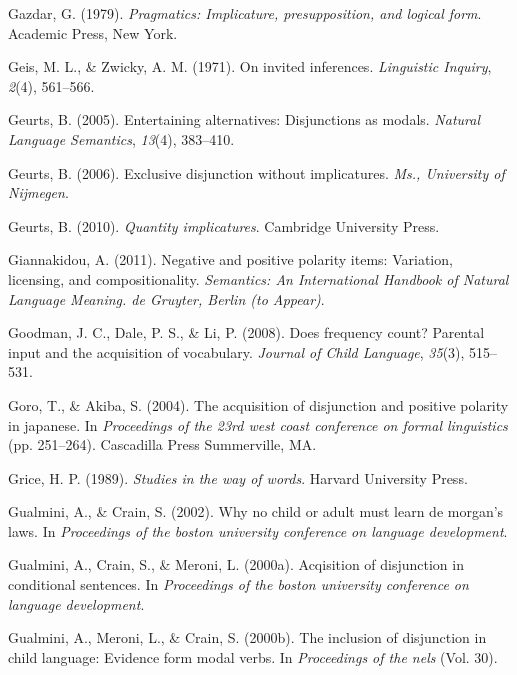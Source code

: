 \documentclass[oneside]{report}
\theoremstyle{definition}
\theoremstyle{definition}
\theoremstyle{definition}
\theoremstyle{remark}
\begin{document}
\hypertarget{ref-gazdar79}{}
Gazdar, G. (1979). \emph{Pragmatics: Implicature, presupposition, and
logical form}. Academic Press, New York.

\hypertarget{ref-geis1971invited}{}
Geis, M. L., \& Zwicky, A. M. (1971). On invited inferences.
\emph{Linguistic Inquiry}, \emph{2}(4), 561--566.

\hypertarget{ref-geurts2005entertaining}{}
Geurts, B. (2005). Entertaining alternatives: Disjunctions as modals.
\emph{Natural Language Semantics}, \emph{13}(4), 383--410.

\hypertarget{ref-geurts2006exclusive}{}
Geurts, B. (2006). Exclusive disjunction without implicatures.
\emph{Ms., University of Nijmegen}.

\hypertarget{ref-geurts2010quantity}{}
Geurts, B. (2010). \emph{Quantity implicatures}. Cambridge University
Press.

\hypertarget{ref-giannakidou2011negative}{}
Giannakidou, A. (2011). Negative and positive polarity items: Variation,
licensing, and compositionality. \emph{Semantics: An International
Handbook of Natural Language Meaning. de Gruyter, Berlin (to Appear)}.

\hypertarget{ref-goodman2008does}{}
Goodman, J. C., Dale, P. S., \& Li, P. (2008). Does frequency count?
Parental input and the acquisition of vocabulary. \emph{Journal of Child
Language}, \emph{35}(3), 515--531.

\hypertarget{ref-goro2004acquisition}{}
Goro, T., \& Akiba, S. (2004). The acquisition of disjunction and
positive polarity in japanese. In \emph{Proceedings of the 23rd west
coast conference on formal linguistics} (pp. 251--264). Cascadilla Press
Summerville, MA.

\hypertarget{ref-grice1989studies}{}
Grice, H. P. (1989). \emph{Studies in the way of words}. Harvard
University Press.

\hypertarget{ref-gualminicrain2002}{}
Gualmini, A., \& Crain, S. (2002). Why no child or adult must learn de
morgan's laws. In \emph{Proceedings of the boston university conference
on language development}.

\hypertarget{ref-gualmini2000}{}
Gualmini, A., Crain, S., \& Meroni, L. (2000a). Acqisition of
disjunction in conditional sentences. In \emph{Proceedings of the boston
university conference on language development}.

\hypertarget{ref-gualmini2000inclusion}{}
Gualmini, A., Meroni, L., \& Crain, S. (2000b). The inclusion of
disjunction in child language: Evidence form modal verbs. In
\emph{Proceedings of the nels} (Vol. 30).
\end{document}
